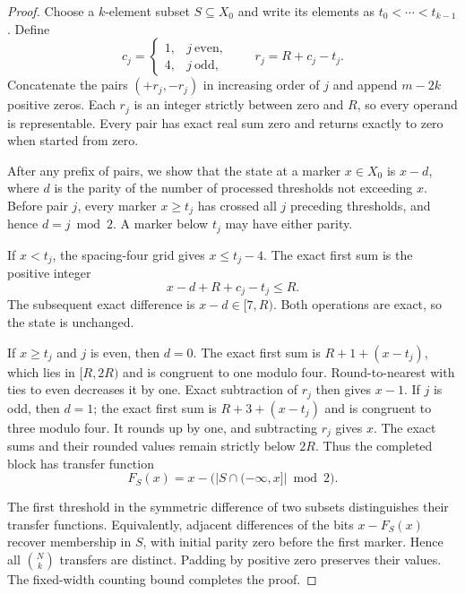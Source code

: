 \documentclass[11pt,reqno]{amsart}
\theoremstyle{definition}
\theoremstyle{remark}
\numberwithin{equation}{section}
\begin{document}
\begin{proof}
Choose a $k$-element subset $S\subseteq X_0$ and write its elements as
$t_0<\cdots<t_{k-1}$. Define
\begin{equation}
\label{eq:threshold-radii}
 c_j=
 \begin{cases}
  1,&j\ \text{even},\\
  4,&j\ \text{odd},
 \end{cases}
 \qquad r_j=R+c_j-t_j.
\end{equation}
Concatenate the pairs $(+r_j,-r_j)$ in increasing order of $j$ and
append $m-2k$ positive zeros. Each $r_j$ is an integer strictly between
zero and $R$, so every operand is representable. Every pair has exact
real sum zero and returns exactly to zero when started from zero.

After any prefix of pairs, we show that the state
at a marker $x\in X_0$ is $x-d$, where $d$ is the parity of the number
of processed thresholds not exceeding $x$. Before pair $j$, every marker
$x\geq t_j$ has crossed all $j$ preceding thresholds, and hence
$d=j\bmod 2$. A marker below $t_j$ may have either parity.

If $x<t_j$, the spacing-four grid gives $x\leq t_j-4$. The exact first
sum is the positive integer
\[
  x-d+R+c_j-t_j\leq R.
\]
The subsequent exact difference is $x-d\in[7,R)$. Both operations are
exact, so the state is unchanged.

If $x\geq t_j$ and $j$ is even, then $d=0$. The exact first sum is
$R+1+(x-t_j)$, which lies in $[R,2R)$ and is congruent to one modulo
four. Round-to-nearest with ties to even decreases it by one. Exact
subtraction of $r_j$ then gives $x-1$. If $j$ is odd, then $d=1$; the
exact first sum is $R+3+(x-t_j)$ and is congruent to three modulo four.
It rounds up by one, and subtracting $r_j$ gives $x$. The exact sums
and their rounded values remain strictly below $2R$. Thus the completed
block has transfer function
\begin{equation}
\label{eq:threshold-transfer}
 F_S(x)=x-\bigl(\lvert S\cap(-\infty,x]\rvert\bmod 2\bigr).
\end{equation}

The first threshold in the symmetric difference of two subsets
distinguishes their transfer functions. Equivalently, adjacent
differences of the bits $x-F_S(x)$ recover membership in $S$, with
initial parity zero before the first marker. Hence all $\binom Nk$
transfers are distinct. Padding by positive zero preserves their values.
The fixed-width counting bound completes the proof.
\end{proof}
\end{document}
